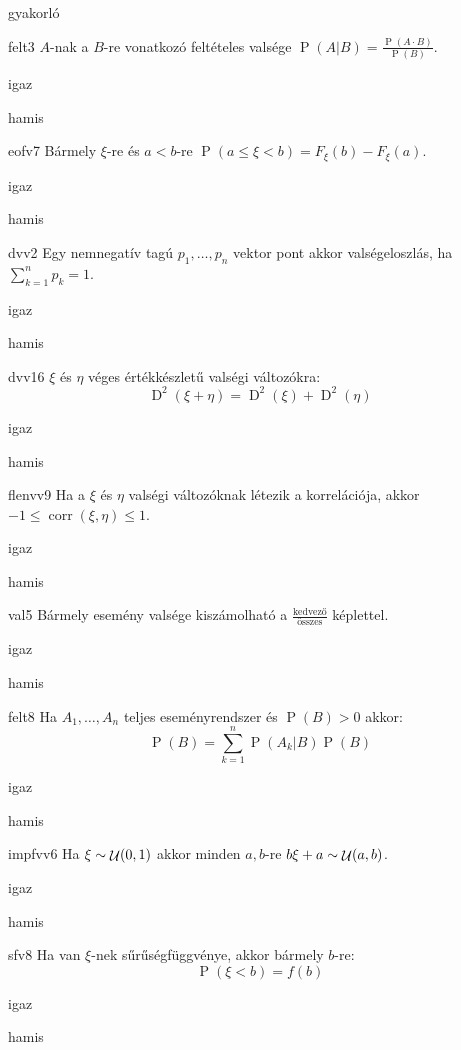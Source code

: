 \documentclass[12pt]{article}
\DeclareMathOperator{\D}{D}
\renewcommand{\P}{\operatorname{P}}
\DeclareMathOperator{\corr}{corr}
\DeclareMathOperator{\Unif}{{\cal U}}
\begin{document}
\begin{quiz}{gyakorló}
\begin{multi}{felt3}
$A$-nak a $B$-re vonatkozó feltételes valsége $\P(A|B)=\frac{\P(A\cdot B)}{\P(B)}$.
\item igaz
\item* hamis
\end{multi}
\begin{multi}{eofv7}
Bármely $\xi$-re és $a<b$-re $\P(a\le \xi <b)=F_{\xi}(b)-F_{\xi}(a)$.
\item* igaz
\item hamis
\end{multi}
\begin{multi}{dvv2}
Egy nemnegatív tagú $p_1,\ldots, p_n$ vektor pont akkor valségeloszlás, ha $\sum_{k=1}^n p_k=1$.
\item* igaz
\item hamis
\end{multi}
\begin{multi}{dvv16}
$\xi$ és $\eta$ véges értékkészletű valségi változókra:
$$
\D^2(\xi+\eta)=\D^2(\xi)+\D^2(\eta)
$$
\item igaz
\item* hamis
\end{multi}
\begin{multi}{flenvv9}
Ha a $\xi$ és $\eta$ valségi változóknak létezik a korrelációja, akkor $-1\le \corr(\xi,\eta)\le 1$.
\item* igaz
\item hamis
\end{multi}
\begin{multi}{val5}
Bármely esemény valsége kiszámolható a $\frac{\text{kedvező}}{\text{összes}}$ képlettel.
\item igaz
\item* hamis
\end{multi}
\begin{multi}{felt8}
Ha $A_1,\ldots,A_n$ teljes eseményrendszer és $\P(B)>0$ akkor:
$$
\P(B)=\sum_{k=1}^n \P(A_k|B)\P(B)
$$
\item* igaz
\item hamis
\end{multi}
\begin{multi}{impfvv6}
Ha $\xi\sim \Unif(0,1)$ akkor  minden $a,b$-re $b\xi+a\sim \Unif(a,b)$.
\item igaz
\item* hamis
\end{multi}
\begin{multi}{sfv8}
Ha van $\xi$-nek sűrűségfüggvénye, akkor bármely $b$-re:
$$
\P(\xi<b)=f(b)
$$
\item igaz
\item* hamis

\end{multi}
\end{quiz}
\end{document}
